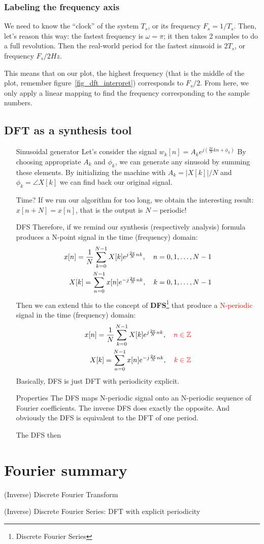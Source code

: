 \documentclass[11pt,a4paper]{article}
\begin{document}
\subsubsection{Labeling the frequency axis}
We need to know the ``clock'' of the system $T_s$, or its frequency $F_s = 1/T_s$. Then, let's reason this way: the fastest frequency is $\omega = \pi$; it then takes 2 samples to do a full revolution. Then the real-world period for the fastest sinusoid is $2T_s$, or frequency $F_s/2 Hz$.

This means that on our plot, the highest frequency (that is the middle of the plot, remember figure\ \ref{fig_dft_interpret}) corresponds to $F_s/2$. From here, we only apply a linear mapping to find the frequency corresponding to the sample numbers. 

\subsection{DFT as a synthesis tool}
\begin{itemize}
	\item[Sinusoidal generator]Let's consider the signal $w_k[n] = A_k e^{j(\frac{2 \pi}{N} k n + \phi_k)}$ By choosing appropriate $A_k$ and $\phi_k$, we can generate any sinusoid by summing these elements. By initializing the machine with $A_k = |X[k]|/N$ and $\phi_k = \angle X[k]$ we can find back our original signal.
	\item[Time?]If we run our algorithm for too long, we obtain the interesting result: $x[n+N]  =x[n]$, that is the output is $N-$periodic!
	
	\item[DFS]Therefore, if we remind our synthesis (respectively analysis) formula produces a N-point signal in the time (frequency) domain:
	\begin{align}
		x[n] = \frac{1}{N} \somme{N-1}{k=0}X[k] e^{j\frac{2\pi}{N}nk},\quad n=0,1,\ldots,N-1\\
		X[k] = \somme{N-1}{n=0}x[n]e^{-j\frac{2\pi}{N}nk},\quad k=0,1,\ldots,N-1
	\end{align}
	Then we can extend this to the concept of \textbf{DFS}\footnote{Discrete Fourier Series} that produce a \textcolor{red}{N-periodic} signal in the time (frequency) domain:
	\begin{align}
		x[n] = \frac{1}{N} \somme{N-1}{k=0}X[k] e^{j\frac{2\pi}{N}nk},\quad \textcolor{red}{n\in\Z}\\
		X[k] = \somme{N-1}{n=0}x[n]e^{-j\frac{2\pi}{N}nk},\quad \textcolor{red}{k\in\Z}
	\end{align}
	Basically, DFS is just DFT with periodicity explicit.
	\item[Properties]The DFS maps N-periodic signal onto an N-periodic sequence of Fourier coefficients. The inverse DFS does exactly the opposite. And obviously the DFS is equivalent to the DFT of one period.

	The DFS then 
\end{itemize}


\appendix
\section{Fourier summary}
\begin{description}
	\item[(I)DFT] (Inverse) Discrete Fourier Transform
	\item[(I)DFS] (Inverse) Discrete Fourier Series: DFT with explicit periodicity
	\item
\end{description}
\end{document}
